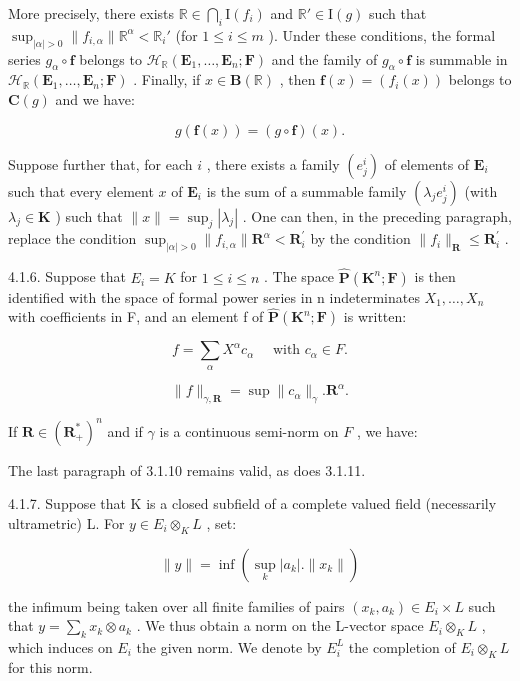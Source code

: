 More precisely, there exists \(\mathbb{R} \in \bigcap_{i} \mathrm{I}(f_i)\) and \(\mathbb{R}' \in \mathrm{I}(g)\) such that \(\sup_{|\alpha| > 0} \| f_{i,\alpha} \| \mathbb{R}^{\alpha} < \mathbb{R}_i'\) (for \(1 \leqslant i \leqslant m\) ). Under these conditions, the formal series \(g_{\alpha} \circ \mathbf{f}\) belongs to \(\mathcal{H}_{\mathbb{R}}(\mathbf{E}_1, \ldots, \mathbf{E}_n; \mathbf{F})\) and the family of \(g_{\alpha} \circ \mathbf{f}\) is summable in \(\mathcal{H}_{\mathbb{R}}(\mathbf{E}_1, \ldots, \mathbf{E}_n; \mathbf{F})\) . Finally, if \(x \in \mathbf{B}(\mathbb{R})\) , then \(\mathbf{f}(x) = (f_i(x))\) belongs to \(\mathbf{C}(g)\) and we have:

\[
g (\mathbf {f} (x)) = (g \circ \mathbf {f}) (x).
\]

Suppose further that, for each \(i\) , there exists a family \((e_{j}^{i})\) of elements of \(\mathbf{E}_{i}\) such that every element \(x\) of \(\mathbf{E}_{i}\) is the sum of a summable family \((\lambda_{j}e_{j}^{i})\) (with \(\lambda_{j}\in\mathbf{K}\) ) such that \(\|x\|=\sup_{j}|\lambda_{j}|\) . One can then, in the preceding paragraph, replace the condition \(\sup_{|\alpha|>0}\|f_{i,\alpha}\|\mathbf{R}^{\alpha}<\mathbf{R}_{i}^{\prime}\) by the condition \(\|f_{i}\|_{\mathbf{R}}\leqslant\mathbf{R}_{i}^{\prime}\) .

4.1.6. Suppose that \(E_{i} = K\) for \(1 \leqslant i \leqslant n\) . The space \(\hat{\mathbf{P}}(\mathbf{K}^{n}; \mathbf{F})\) is then identified with the space of formal power series in n indeterminates \(X_{1}, \ldots, X_{n}\) with coefficients in F, and an element f of \(\hat{\mathbf{P}}(\mathbf{K}^{n}; \mathbf{F})\) is written:

\[
f = \sum_ {\alpha} X ^ {\alpha} c _ {\alpha} \quad \text { with } c _ {\alpha} \in F.
\]

\[
\| f \| _ {\gamma , \mathbf {R}} = \sup \| c _ {\alpha} \| _ {\gamma}. \mathbf {R} ^ {\alpha}.
\]

If \(\mathbf{R} \in (\mathbf{R}_{+}^{*})^{n}\) and if \(\gamma\) is a continuous semi-norm on \(F\) , we have:

The last paragraph of 3.1.10 remains valid, as does 3.1.11.

4.1.7. Suppose that K is a closed subfield of a complete valued field (necessarily ultrametric) L. For \(y \in E_{i} \otimes_{K} L\) , set:

\[
\| y \| = \inf (\sup _ {k} | a _ {k} |. \| x _ {k} \|)
\]

the infimum being taken over all finite families of pairs \((x_{k}, a_{k}) \in E_{i} \times L\) such that \(y = \sum_{k} x_{k} \otimes a_{k}\) . We thus obtain a norm on the L-vector space \(E_{i} \otimes_{K} L\) , which induces on \(E_{i}\) the given norm. We denote by \(E_{i}^{L}\) the completion of \(E_{i} \otimes_{K} L\) for this norm.

